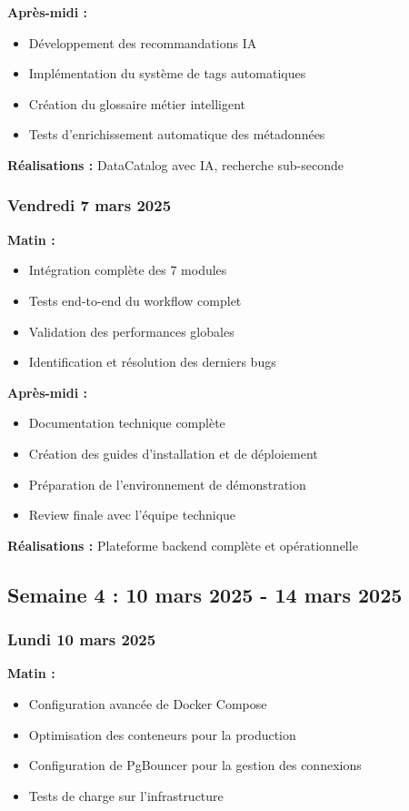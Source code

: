 \documentclass[a4paper,12pt]{article}
\begin{document}
\textbf{Après-midi :}
\begin{itemize}
    \item Développement des recommandations IA
    \item Implémentation du système de tags automatiques
    \item Création du glossaire métier intelligent
    \item Tests d'enrichissement automatique des métadonnées
\end{itemize}

\textbf{Réalisations :} DataCatalog avec IA, recherche sub-seconde

\subsubsection*{Vendredi 7 mars 2025}
\textbf{Matin :}
\begin{itemize}
    \item Intégration complète des 7 modules
    \item Tests end-to-end du workflow complet
    \item Validation des performances globales
    \item Identification et résolution des derniers bugs
\end{itemize}

\textbf{Après-midi :}
\begin{itemize}
    \item Documentation technique complète
    \item Création des guides d'installation et de déploiement
    \item Préparation de l'environnement de démonstration
    \item Review finale avec l'équipe technique
\end{itemize}

\textbf{Réalisations :} Plateforme backend complète et opérationnelle

\subsection*{Semaine 4 : 10 mars 2025 - 14 mars 2025}

\subsubsection*{Lundi 10 mars 2025}
\textbf{Matin :}
\begin{itemize}
    \item Configuration avancée de Docker Compose
    \item Optimisation des conteneurs pour la production
    \item Configuration de PgBouncer pour la gestion des connexions
    \item Tests de charge sur l'infrastructure
\end{itemize}
\end{document}
